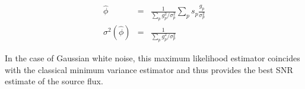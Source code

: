 \begin{eqnarray}
\hat{\phi} &=& \frac{1}{\sum_p g_p^2/\sigma_p^2}\sum_p
s_p\frac{g_p}{\sigma_p^2} \label{eq:flux_estim_def} \\
\sigma^2(\hat{\phi}) &=& \frac{1}{\sum_p
  g_p^2/\sigma_p^2} \label{eq:flux_estim_var_def}
\end{eqnarray}

In the case of Gaussian white noise, this maximum likelihood estimator coincides
with the classical minimum variance estimator and thus provides the best SNR
estimate of the source flux.


